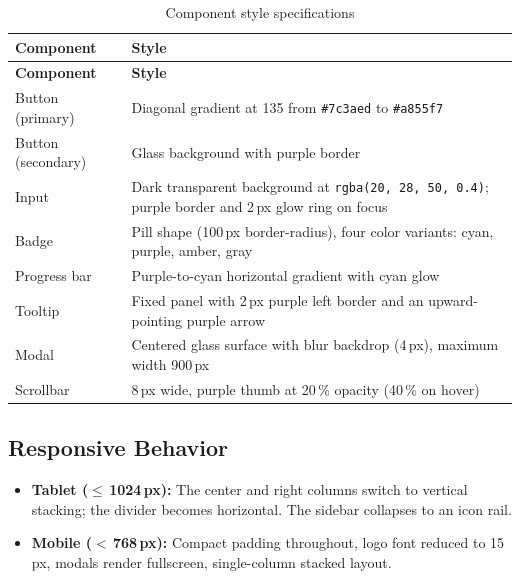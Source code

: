\documentclass[a4paper, 11pt, oneside]{report}
\begin{document}
\begin{longtable}{l L{9cm}}
  \caption{Component style specifications}
  \label{tab:component-styles} \\
  \toprule
  \textbf{Component} & \textbf{Style} \\
  \midrule
  \endfirsthead
  \toprule
  \textbf{Component} & \textbf{Style} \\
  \midrule
  \endhead
  Button (primary)   & Diagonal gradient at 135\textdegree{} from
                       \texttt{\#7c3aed} to \texttt{\#a855f7} \\
  Button (secondary) & Glass background with purple border \\
  Input              & Dark transparent background at
                       \texttt{rgba(20,\,28,\,50,\,0.4)}; purple border
                       and 2\,px glow ring on focus \\
  Badge              & Pill shape (100\,px border-radius), four color
                       variants: cyan, purple, amber, gray \\
  Progress bar       & Purple-to-cyan horizontal gradient with cyan glow \\
  Tooltip            & Fixed panel with 2\,px purple left border and an
                       upward-pointing purple arrow \\
  Modal              & Centered glass surface with blur backdrop (4\,px),
                       maximum width 900\,px \\
  Scrollbar          & 8\,px wide, purple thumb at 20\,\% opacity
                       (40\,\% on hover) \\
  \bottomrule
\end{longtable}

\subsection{Responsive Behavior}

\begin{itemize}
  \item \textbf{Tablet ($\leq$\,1024\,px):} The center and right columns
        switch to vertical stacking; the divider becomes horizontal.  The
        sidebar collapses to an icon rail.
  \item \textbf{Mobile ($<$\,768\,px):} Compact padding throughout, logo
        font reduced to 15\,px, modals render fullscreen, single-column
        stacked layout.
\end{itemize}
\end{document}
